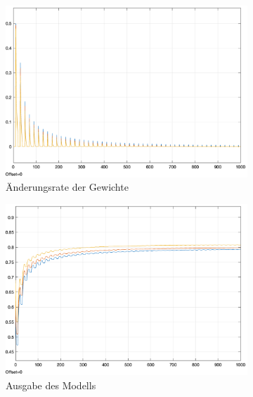 \begin{figure}[h]
  \label{fig:C-EP Annäherung Konvergenz}
  \caption{Eine Annäherung an C-EP findet passende Parameter für das Netzwerk}
  \centering
  \begin{subfigure}[b]{0.3\textwidth}
    \includegraphics[width=\textwidth]{abbildungen/c_ep_approx_convergence_weight_update.png}
    \caption{Änderungsrate der Gewichte}
  \end{subfigure}%
  \hfill
  \begin{subfigure}[b]{0.3\textwidth}
    \includegraphics[width=\textwidth]{abbildungen/c_ep_approx_convergence_ausgabe.png}
    \caption{Ausgabe des Modells}
  \end{subfigure}%
  \hfill
  \begin{subfigure}[b]{0.3\textwidth}

\end{subfigure}
\end{figure}
